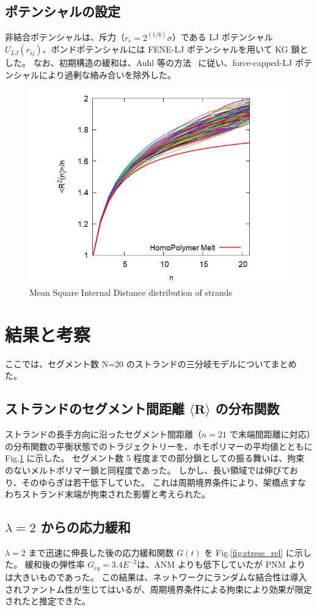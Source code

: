 \documentclass[uplatex,10pt,a4paper,twocolumn]{jsarticle}
\begin{document}
\subsection{ポテンシャルの設定}
非結合ポテンシャルは、斥力（$r_c = 2^{(1/6)}\sigma$）である LJ ポテンシャル $U_{LJ}(r_{ij})$、ボンドポテンシャルには FENE-LJ ポテンシャルを用いて KG 鎖とした。
なお、初期構造の緩和は、Auhl 等の方法~\cite{Auhl2003a} に従い、force-capped-LJ ポテンシャルにより過剰な絡み合いを除外した。

\begin{figure}[htb]
	\centering
	   \includegraphics[width=.42\textwidth]{N20_f3_CN.png}
	   \caption{Mean Square Internal Distance distribution of strands}
	   \label{fig:e2e}
   \end{figure}
   \vspace{-5mm}
   
\section{結果と考察}
\vspace{-2mm}

ここでは、セグメント数 N=20 のストランドの三分岐モデルについてまとめた。

\subsection{ストランドのセグメント間距離 $\langle \bm{R} \rangle$ の分布関数}

ストランドの長手方向に沿ったセグメント間距離（$n=21$ で末端間距離に対応）の分布関数の平衡状態でのトラジェクトリーを、ホモポリマーの平均値とともに Fig.\ref{fig:e2e} に示した。
セグメント数 5 程度までの部分鎖としての振る舞いは、拘束のないメルトポリマー鎖と同程度であった。
しかし、長い領域では伸びており、そのゆらぎは若干低下していた。
これは周期境界条件により、架橋点すなわちストランド末端が拘束された影響と考えられた。

\subsection{$\lambda =2$ からの応力緩和}
$\lambda =2$ まで迅速に伸長した後の応力緩和関数 $G(t)$ を Fig.\ref{fig:stress_rel} に示した。
緩和後の弾性率 $G_{eq} = 3.4E^{-2}$は、ANM よりも低下していたが PNM よりは大きいものであった。
この結果は、ネットワークにランダムな結合性は導入されファントム性が生じてはいるが、周期境界条件による拘束により効果が限定されたと推定できた。
\end{document}
